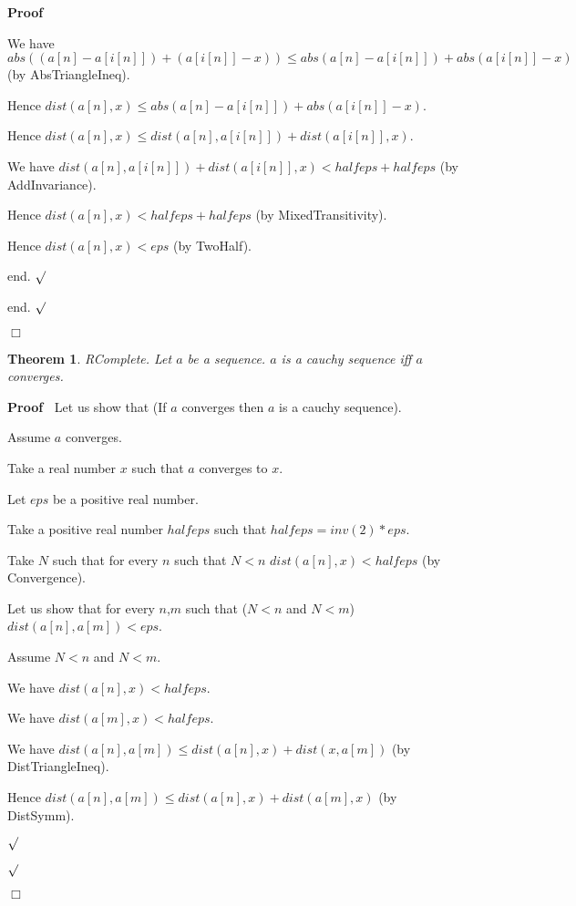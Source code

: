 \documentclass{article}
\newenvironment{forthel}{\begin{leftbar}}{\end{leftbar}}
\newenvironment{proof}{\noindent\textbf{Proof\ }}{\hspace*{\fill}$\Box$\medskip}
\newenvironment{subproof}{\begin{list}{}{}
		\item[\text{Proof}]}{\hfill $\surd$ \end{list}}
\newtheorem{theorem}{Theorem}
\begin{document}
\begin{forthel}
\begin{proof}
\begin{subproof}
\begin{subproof}
				We have $abs((a[n] - a[i[n]]) + (a[i[n]] - x)) \leq abs(a[n] - a[i[n]]) + abs(a[i[n]] - x)$ (by AbsTriangleIneq).
				
				Hence $dist(a[n],x) \leq abs(a[n] - a[i[n]]) + abs(a[i[n]] - x)$.
				
				Hence $dist(a[n],x) \leq dist(a[n],a[i[n]]) + dist(a[i[n]],x)$.
				
				We have $dist(a[n],a[i[n]]) + dist(a[i[n]],x) < halfeps + halfeps$ (by AddInvariance).
				
				Hence $dist(a[n],x) < halfeps + halfeps$ (by MixedTransitivity).
				
				Hence $dist(a[n],x) < eps$ (by TwoHalf).
				
				end.
			\end{subproof}
			
			end.
		\end{subproof}
	\end{proof}
	
	\begin{theorem}
		RComplete.
		Let $a$ be a sequence. $a$ is a cauchy sequence iff $a$ converges.
	\end{theorem}
	
	\begin{proof}
		Let us show that (If $a$ converges then $a$ is a cauchy sequence).
		
		\begin{subproof}
			Assume $a$ converges.
			
			Take a real number $x$ such that $a$ converges to $x$.
			
			Let $eps$ be a positive real number.
			
			Take a positive real number $halfeps$ such that $halfeps = inv(2) * eps$.
			
			Take $N$ such that for every $n$ such that $N < n$ $dist(a[n],x) < halfeps$ (by Convergence).
			
			Let us show that for every $n$,$m$ such that ($N < n$ and $N < m$) $dist(a[n],a[m]) < eps$.
			
			\begin{subproof}
				Assume $N < n$ and $N < m$.
				
				We have $dist(a[n],x) < halfeps$.
				
				We have $dist(a[m],x) < halfeps$.
				
				We have $dist(a[n],a[m]) \leq dist(a[n],x) + dist(x,a[m])$ (by DistTriangleIneq).
				
				Hence $dist(a[n],a[m]) \leq dist(a[n],x) + dist(a[m],x)$ (by DistSymm).
				

\end{subproof}
\end{subproof}
\end{proof}
\end{forthel}
\end{document}
